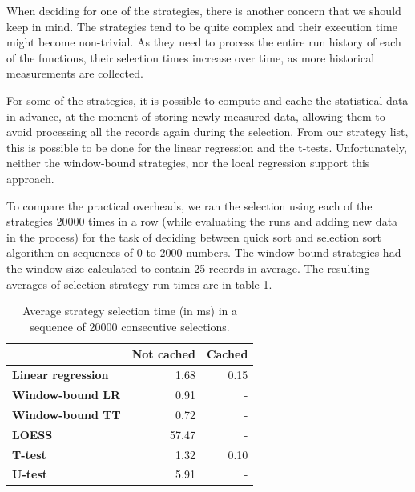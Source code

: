 When deciding for one of the strategies, there is another concern that we should keep in mind. The strategies tend to be quite complex and their execution time might become non-trivial. As they need to process the entire run history of each of the functions, their selection times increase over time, as more historical measurements are collected.

For some of the strategies, it is possible to compute and cache the statistical data in advance, at the moment of storing newly measured data, allowing them to avoid processing all the records again during the selection. From our strategy list, this is possible to be done for the linear regression and the t-tests. Unfortunately, neither the window-bound strategies, nor the local regression support this approach.

To compare the practical overheads, we ran the selection using each of the strategies 20000 times in a row (while evaluating the runs and adding new data in the process) for the task of deciding between quick sort and selection sort algorithm on sequences of 0 to 2000 numbers. The window-bound strategies had the window size calculated to contain 25 records in average. The resulting averages of selection strategy run times are in table \ref{tab:strategy_execution_comparison}.

\begin{table}[h!]
	\captionsetup{justification=centering,margin=0.5cm}
	\centering
	\bgroup
	\def\arraystretch{1.5}%
	\begin{tabular}{|l|r|r|}
		\hline
		\textbf{}                  & \multicolumn{1}{l|}{\textbf{Not cached}} & \multicolumn{1}{l|}{\textbf{Cached}} \\ \hline
		\textbf{Linear regression} & 1.68                                     & 0.15                                 \\ \hline
		\textbf{Window-bound LR}   & 0.91                                     & -                                  \\ \hline
		\textbf{Window-bound TT}   & 0.72                                     & -                                  \\ \hline
		\textbf{LOESS}             & 57.47                                    & -                                  \\ \hline
		\textbf{T-test}            & 1.32                                     & 0.10                                 \\ \hline
		\textbf{U-test}            & 5.91                                     & -                                  \\ \hline
	\end{tabular}
\egroup
\caption{Average strategy selection time (in ms) in a sequence of 20000 consecutive selections.}
\label{tab:strategy_execution_comparison}
\end{table}


